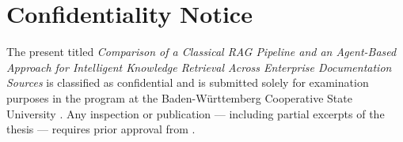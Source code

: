 
\thispagestyle{empty}
\section*{Confidentiality Notice}

\vspace*{2em}

The present \arbeit{} titled {\itshape Comparison of a Classical RAG Pipeline and an Agent-Based Approach for Intelligent Knowledge Retrieval Across Enterprise Documentation Sources} is classified as confidential and is submitted solely for examination purposes in the \studiengang{} program at the Baden-Württemberg Cooperative State University \dhbw. Any inspection or publication — including partial excerpts of the thesis — requires prior approval from \firma.
